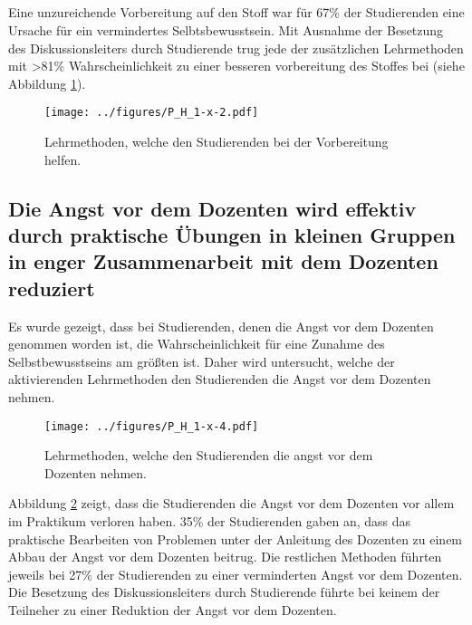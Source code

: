 \subsection{}
Eine unzureichende Vorbereitung auf den Stoff war für 67\% der Studierenden eine Ursache für ein vermindertes Selbtsbewusstsein. Mit Ausnahme der Besetzung des Diskussionsleiters durch Studierende trug jede der zusätzlichen Lehrmethoden mit >81\% Wahrscheinlichkeit zu einer besseren vorbereitung des Stoffes bei (siehe Abbildung \ref{fig:P_H_1-x-2}).
\begin{figure}[h!]
\begin{center}
	\texttt{[image: ../figures/P\_H\_1-x-2.pdf]}
\end{center}
	\label{fig:P_H_1-x-2}
	\caption{Lehrmethoden, welche den Studierenden bei der Vorbereitung helfen.}
\end{figure}

\subsection{Die Angst vor dem Dozenten wird effektiv durch praktische Übungen in kleinen Gruppen in enger Zusammenarbeit mit dem Dozenten reduziert}
Es wurde gezeigt, dass bei Studierenden, denen die Angst vor dem Dozenten genommen worden ist, die Wahrscheinlichkeit für eine Zunahme des Selbstbewusstseins am größten ist. Daher wird untersucht, welche der aktivierenden Lehrmethoden den Studierenden die Angst vor dem Dozenten nehmen.
\begin{figure}[h!]
\begin{center}
	\texttt{[image: ../figures/P\_H\_1-x-4.pdf]}
\end{center}
	\label{fig:P_H_1-x-4}
	\caption{Lehrmethoden, welche den Studierenden die angst vor dem Dozenten nehmen.}
\end{figure}
Abbildung \ref{fig:P_H_1-x-4} zeigt, dass die Studierenden die Angst vor dem Dozenten vor allem im Praktikum verloren haben. 35\% der Studierenden gaben an, dass das praktische Bearbeiten von Problemen unter der Anleitung des Dozenten zu einem Abbau der Angst vor dem Dozenten beitrug. Die restlichen Methoden führten jeweils bei 27\% der Studierenden zu einer verminderten Angst vor dem Dozenten. Die Besetzung des Diskussionsleiters durch Studierende führte bei keinem der Teilneher zu einer Reduktion der Angst vor dem Dozenten.